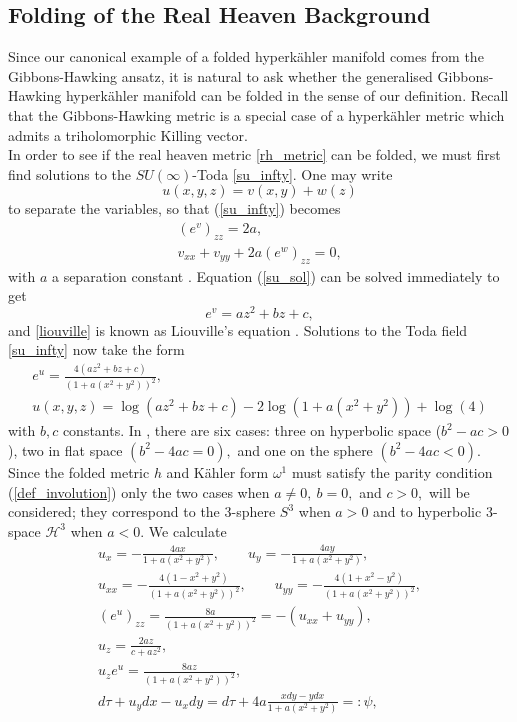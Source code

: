 \documentclass[a4paper,12pt, onecolumn, notitlepage]{article}
\theoremstyle{definition}
\theoremstyle{remark}
\newcommand{\w}{\omega}
\newcommand{\K}{K\"ahler }
\newcommand{\HK}{hyperk\"ahler }
\begin{document}
\subsection{Folding of the Real Heaven Background}
Since our canonical example of a folded \HK manifold comes from the Gibbons-Hawking ansatz, it is natural to ask whether the generalised Gibbons-Hawking \HK manifold can be folded in the sense of our definition. Recall that the Gibbons-Hawking metric is a special case of a \HK metric which admits a triholomorphic Killing vector.\\
In order to see if the real heaven metric \cref{rh_metric} can be folded, we must first find solutions to the $SU(\infty)$-Toda \cref{su_infty}. One may write
\begin{equation*}
	u(x,y,z) = v(x,y) + w(z)
\end{equation*}
to separate the variables, so that (\ref{su_infty}) becomes
\begin{subequations}
	\begin{gather}
	\label{su_sol}
	(e^{v})_{zz} = 2a,\\
	\label{liouville}
	v_{xx} + v_{yy} + 2a(e^{w})_{zz}=0,
	\end{gather}
\end{subequations}
with $a$ a separation constant \cite{tod_1995}. Equation (\ref{su_sol}) can be solved immediately to get
\begin{equation}
	e^{v} = az^{2} + bz + c,
\end{equation}
and \cref{liouville} is known as Liouville's equation \cite{tod_1995}. Solutions to the Toda field \cref{su_infty} now take the form
\begin{gather}
	e^{u}=\frac{4(az^{2}+bz+c)}{(1+a(x^{2}+y^{2}))^{2}},\\
	u(x,y,z) = \log(az^{2}+bz+c)-2\log(1+a(x^{2}+y^{2})) +\log(4)
\end{gather}
with $b,c$ constants. In \cite{tod_1995}, there are six cases: three on hyperbolic space ($b^{2}-ac>0$), two in flat space $(b^{2}-4ac=0),$ and one on the sphere $(b^{2}-4ac<0).$ Since the folded metric $h$ and \K form $\w^{1}$ must satisfy the parity condition (\ref{def_involution}) only the two cases when $a\neq 0,\ b=0,$ and $c>0,$ will be considered; they correspond to the 3-sphere $S^{3}$ when $a>0$ and to hyperbolic 3-space $\mathcal{H}^{3}$ when $a<0.$ We calculate
\begin{subequations}
	\begin{gather*}
	u_{x} = -\frac{4ax}{1+a(x^{2} + y^{2})}, \qquad u_{y} = -\frac{4ay}{1+a(x^{2} + y^{2})},\\
	u_{xx} = -\frac{4(1-x^{2}+y^{2})}{(1+a(x^{2} + y^{2}))^{2}},\qquad u_{yy} = -\frac{4(1+x^{2}-y^{2})}{(1+a(x^{2} + y^{2}))^{2}},\\
	(e^{u})_{zz} = \frac{8a}{(1+a(x^{2} + y^{2}))^{2}} = -(u_{xx} + u_{yy}),\\
	u_{z} = \frac{2az}{c+az^{2}},\\
	u_{z}e^{u} = \frac{8az}{(1+a(x^{2} + y^{2}))^{2}},\\
	d\tau + u_{y}dx-u_{x}dy = d\tau + 4a\frac{xdy-ydx}{1+a(x^{2} + y^{2})} =: \psi,
	\end{gather*}
\end{subequations}
\end{document}
